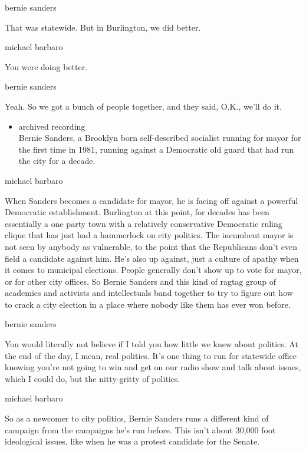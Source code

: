bernie sanders

That was statewide. But in Burlington, we did better.

michael barbaro

You were doing better.

bernie sanders

Yeah. So we got a bunch of people together, and they said, O.K., we'll
do it.

\begin{itemize}
\tightlist
\item
  archived recording\\
  Bernie Sanders, a Brooklyn born self-described socialist running for
  mayor for the first time in 1981, running against a Democratic old
  guard that had run the city for a decade.
\end{itemize}

michael barbaro

When Sanders becomes a candidate for mayor, he is facing off against a
powerful Democratic establishment. Burlington at this point, for decades
has been essentially a one party town with a relatively conservative
Democratic ruling clique that has just had a hammerlock on city
politics. The incumbent mayor is not seen by anybody as vulnerable, to
the point that the Republicans don't even field a candidate against him.
He's also up against, just a culture of apathy when it comes to
municipal elections. People generally don't show up to vote for mayor,
or for other city offices. So Bernie Sanders and this kind of ragtag
group of academics and activists and intellectuals band together to try
to figure out how to crack a city election in a place where nobody like
them has ever won before.

bernie sanders

You would literally not believe if I told you how little we knew about
politics. At the end of the day, I mean, real politics. It's one thing
to run for statewide office knowing you're not going to win and get on
our radio show and talk about issues, which I could do, but the
nitty-gritty of politics.

michael barbaro

So as a newcomer to city politics, Bernie Sanders runs a different kind
of campaign from the campaigns he's run before. This isn't about 30,000
foot ideological issues, like when he was a protest candidate for the
Senate.


